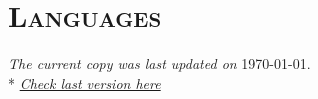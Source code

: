 \documentclass[10pt,a4paper,colorlinks=true]{moderncv} %
\begin{document}
\section{\textsc{Languages}}




\vspace{1.5em}
\begin{flushright}
  \emph{The current copy was last updated on} \today.\\*  %
  \href{https://cv.gerardbosch.xyz}{\emph{Check last version here}}
\end{flushright}





%
\end{document}
